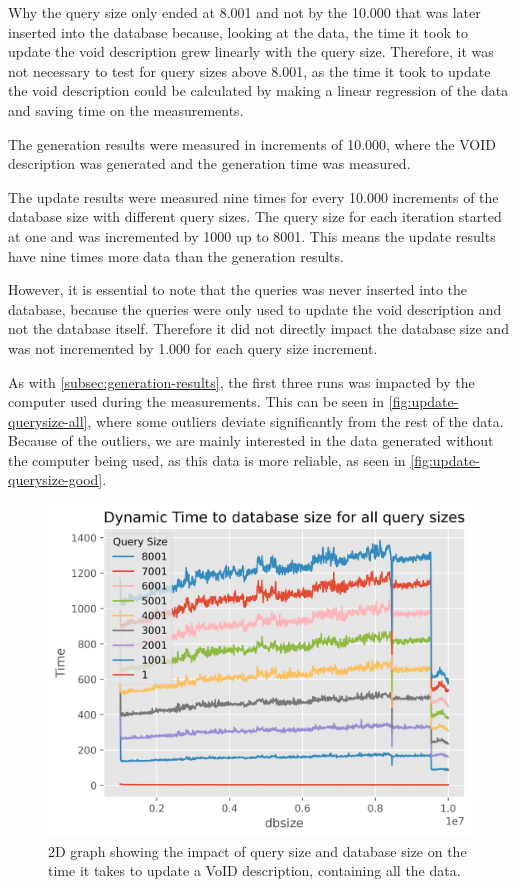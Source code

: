 Why the query size only ended at 8.001 and not by the 10.000 that was later inserted into the database because, looking at the data, the time it took to update the \gls{void} description grew linearly with the query size. Therefore, it was not necessary to test for query sizes above 8.001, as the time it took to update the \gls{void} description could be calculated by making a linear regression of the data and saving time on the measurements.


The generation results were measured in increments of 10.000, where the VOID description was generated and the generation time was measured.

The update results were measured nine times for every 10.000 increments of the database size with different query sizes. The query size for each iteration started at one and was incremented by 1000 up to 8001. This means the update results have nine times more data than the generation results.

However, it is essential to note that the queries was never inserted into the database, because the queries were only used to update the \gls{void} description and not the database itself. Therefore it did not directly impact the database size and was not incremented by 1.000 for each query size increment.

As with \autoref{subsec:generation-results}, the first three runs was impacted by the computer used during the measurements. This can be seen in \autoref{fig:update-querysize-all}, where some outliers deviate significantly from the rest of the data. Because of the outliers, we are mainly interested in the data generated without the computer being used, as this data is more reliable, as seen in \autoref{fig:update-querysize-good}.

\begin{figure}[htb!]
    \centering
    \includegraphics[width=0.8\columnwidth]{figures/dynamic-time-query-size-all.png}
    \caption{2D graph showing the impact of query size and database size on the time it takes to update a VoID description, containing all the data.}
    \label{fig:update-querysize-all}
\end{figure}

